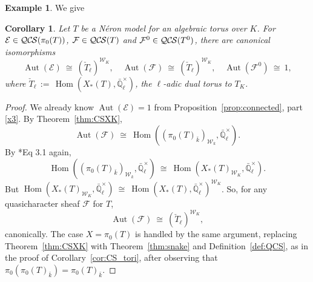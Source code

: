 \documentclass[10pt]{amsart}
\theoremstyle{plain}
\newtheorem{corollary}[theorem]{Corollary}
\theoremstyle{definition}
\newtheorem{example}[theorem]{Example}
\newcommand{\EE}{\mathbb{\bar Q}_\ell}
\newcommand{\bFq}{\bar{k}}
\newcommand{\Fq}{k}
\newcommand{\EEx}{\EE^\times}
\newcommand{\Weil}[1]{\mathcal{W}_{#1}}
\DeclareMathOperator{\Aut}{Aut}
\DeclareMathOperator{\Hom}{Hom}
\newcommand{\ceq}{{\, :=\, }}
\newcommand{\iso}{{\ \cong\ }}
\newcommand{\cs}[1]{{\mathcal{#1}}}
\newcommand{\QCS}{{\mathcal{QC\hskip-0.8pt S}}}
\begin{document}
\begin{example}
We give 
\end{example}

\begin{corollary}
Let $T$ be a N\'eron model for an algebraic torus over $K$.
For $\cs{E}\in \QCS(\pi_0(T))$, $\cs{F}\in {\QCS(T)}$ and $\cs{F}^0\in {\QCS(T^0)}$, there are canonical isomorphisms
\[
\Aut(\cs{E})\iso (\check{T}_\ell)^{\Weil{K}},
\quad
\Aut(\cs{F})\iso (\check{T}_\ell)^{\Weil{K}},
\quad
\Aut(\cs{F}^0)\iso 1,
\]
 where $\check{T}_\ell \ceq \Hom(X_*(T),\EEx)$, the $\ell$-adic dual torus to $T_K$.
\end{corollary}

\begin{proof}
We already know $\Aut(\cs{E}) =1$ from Proposition~\ref{prop:connected}, part \ref{x3}.
By Theorem~\ref{thm:CSXK}, 
\[
\Aut(\cs{F})  \iso \Hom((\pi_0(T)_{\bFq})_{\Weil{\Fq}},\EEx).
\]
By \cite{bitan:discriminant}*{Eq 3.1} again, 
\[
\Hom((\pi_0(T)_{\bFq})_{\Weil{\Fq}},\EEx) \iso
\Hom(X_*(T)_{\Weil{K}},\EEx).
\]
But $\Hom(X_*(T)_{\Weil{K}},\EEx) \iso \Hom(X_*(T),\EEx)^{\Weil{K}}$.
So, for any quasicharacter sheaf $\cs{F}$ for $T$,
\[
\Aut(\cs{F}) \iso (\check{T}_\ell)^{\Weil{K}},
\]
canonically.
The case $X= \pi_0(T)$ is handled by the same argument, replacing Theorem~\ref{thm:CSXK} with
Theorem~\ref{thm:snake} and Definition~\ref{def:QCS}, as in the proof of Corollary~\ref{cor:CS_tori},
after observing that $\pi_0(\pi_0(T)_{\bFq}) = \pi_0(T)_{\bFq}$.
\end{proof}
\end{document}
